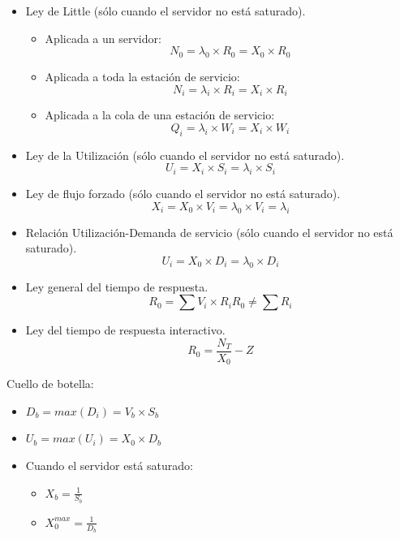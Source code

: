 \documentclass[12pt,spanish]{article}
\begin{document}
\begin{itemize}
	\item Ley de Little (sólo cuando el servidor no está saturado).
		\begin{itemize}
			\item Aplicada a un servidor:
				\begin{equation*}
					N_0 = \lambda_0 \times R_0 = X_0 \times R_0
				\end{equation*}
			\item Aplicada a toda la estación de servicio:
				\begin{equation*}
					N_i = \lambda_i \times R_i = X_i \times R_i
				\end{equation*}
			\item Aplicada a la cola de una estación de servicio:
				\begin{equation*}
					Q_i = \lambda_i \times W_i = X_i \times W_i
				\end{equation*}
		\end{itemize}
		\item Ley de la Utilización (sólo cuando el servidor no está saturado).
			\begin{equation*}
				U_i = X_i \times S_i = \lambda_i \times S_i
			\end{equation*}
		\item Ley de flujo forzado (sólo cuando el servidor no está saturado).
			\begin{equation*}
				X_i = X_0 \times V_i = \lambda_0 \times V_i = \lambda_i
			\end{equation*}
		\item Relación Utilización-Demanda de servicio (sólo cuando el servidor no está saturado).
			\begin{equation*}
				U_i = X_0 \times D_i = \lambda_0 \times D_i
			\end{equation*}
		\item Ley general del tiempo de respuesta.
			\begin{equation*}
				R_0 = \sum{V_i \times R_i}
				R_0 \neq \sum{R_i}
			\end{equation*}
		\item Ley del tiempo de respuesta interactivo.
			\begin{equation*}
				R_0 = \frac{N_T}{X_0} - Z
			\end{equation*}
\end{itemize}

Cuello de botella:

\begin{itemize}
	\item $D_b = max(D_i) = V_b \times S_b$
	\item $U_b = max(U_i) = X_0 \times D_b$
	\item Cuando el servidor está saturado:
		\begin{itemize}
			\item $X_b = \frac{1}{S_b}$
			\item $X_0^{max} = \frac{1}{D_b}$
		\end{itemize}
\end{itemize}
\end{document}
